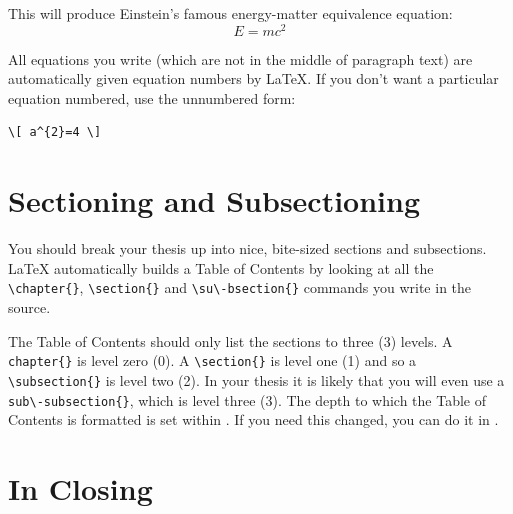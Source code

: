 This will produce Einstein's famous energy-matter equivalence equation:
\begin{equation}
E = mc^{2}
\label{eqn:Einstein}
\end{equation}

All equations you write (which are not in the middle of paragraph text) are automatically given equation numbers by \LaTeX{}. If you don't want a particular equation numbered, use the unnumbered form:
\begin{verbatim}
\[ a^{2}=4 \]
\end{verbatim}


\section{Sectioning and Subsectioning}

You should break your thesis up into nice, bite-sized sections and sub\-sections.
\LaTeX{} auto\-ma\-tically builds a Table of Contents by looking at all the
\verb|\chapter{}|, \verb|\section{}|  and \verb|\su\-bsection{}| commands you
write in the source.

The Table of Con\-tents should only list the sec\-tions to three (3) levels. A
\verb|chapter{}| is level zero (0). A \verb|\section{}| is level one (1) and so
a \verb|\subsection{}| is level two (2). In your thesis it is likely that you
will even use a \verb|sub\-subsection{}|, which is level three (3). The depth to
which the Table of Con\-tents is formatted is set within
. If you need this chang\-ed, you can do it in
.


\section{In Closing}

